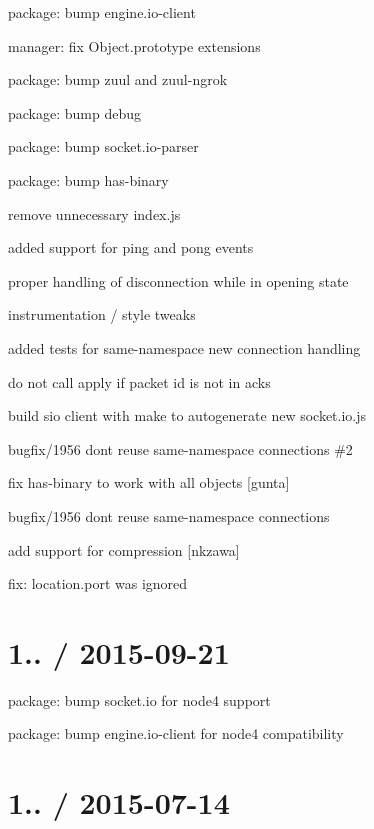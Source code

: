 \begin{DoxyItemize}
\item package\+: bump {\ttfamily engine.\+io-\/client}
\item manager\+: fix {\ttfamily Object.\+prototype} extensions
\item package\+: bump {\ttfamily zuul} and {\ttfamily zuul-\/ngrok}
\item package\+: bump {\ttfamily debug}
\item package\+: bump {\ttfamily socket.\+io-\/parser}
\item package\+: bump {\ttfamily has-\/binary}
\item remove unnecessary {\ttfamily index.\+js}
\item added support for {\ttfamily ping} and {\ttfamily pong} events
\item proper handling of disconnection while in {\ttfamily opening} state
\item instrumentation / style tweaks
\item added tests for same-\/namespace new connection handling
\item do not call apply if packet id is not in acks
\item build sio client with make to autogenerate new socket.\+io.\+js
\item bugfix/1956 don\textquotesingle{}t reuse same-\/namespace connections \#2
\item fix has-\/binary to work with all objects \mbox{[}gunta\mbox{]}
\item bugfix/1956 don\textquotesingle{}t reuse same-\/namespace connections
\item add support for compression \mbox{[}nkzawa\mbox{]}
\item fix\+: location.\+port was ignored
\end{DoxyItemize}

\section*{1.. / 2015-\/09-\/21 }


\begin{DoxyItemize}
\item package\+: bump {\ttfamily socket.\+io} for node4 support
\item package\+: bump {\ttfamily engine.\+io-\/client} for node4 compatibility
\end{DoxyItemize}

\section*{1.. / 2015-\/07-\/14 }


